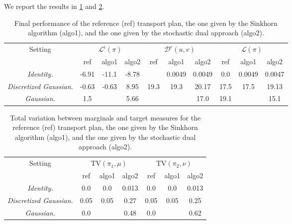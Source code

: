 \documentclass[a4paper,11pt]{article}
\newcommand{\1}{\mathbbm{1}}
\begin{document}
We report the results in \cref{tab:exp2} and \cref{tab:exp2_tv}.

\begin{table}[H]
    \centering
    \begin{tabular}{c|ccc|ccc|ccc}
        \toprule
        \multirow{2}{*}{Setting} & \multicolumn{3}{c}{$\mathcal{L}^{\epsilon}(\pi)$} & \multicolumn{3}{c}{$\mathcal{D}^{\epsilon}(u, v)$} & \multicolumn{3}{c}{$\mathcal{L}(\pi)$} \\
        \cmidrule(lr){2-4} \cmidrule(lr){5-7} \cmidrule(lr){8-10}
        & ref & algo1 & algo2 & ref & algo1 & algo2 & ref & algo1 & algo2 \\
        \midrule
        \emph{Identity.} & -6.91 & -11.1 & -8.78 & & 0.0049 & 0.0049 & 0.0 & 0.0049 & 0.0047 \\
        \emph{Discretized Gaussian.} & -0.63 & -0.63 & 8.95 & 19.3 & 19.3 & 20.17 & 17.5 & 17.5 & 19.13 \\
        \emph{Gaussian.} & 1.5 & & 5.66 & & & 17.0 & 19.1 & & 15.1 \\
        \bottomrule
    \end{tabular}
    \caption{Final performance of the reference (ref) transport plan, the one given by the Sinkhorn algorithm (algo1), and the one given by the stochastic dual approach (algo2).}
    \label{tab:exp2}
\end{table}

\begin{table}[H]
    \centering
    \begin{tabular}{c|ccc|ccc}
        \toprule
        \multirow{2}{*}{Setting} & \multicolumn{3}{c}{$\mathrm{TV}(\pi_1, \mu)$} & \multicolumn{3}{c}{$\mathrm{TV}(\pi_2, \nu)$} \\
        \cmidrule(lr){2-4} \cmidrule(lr){5-7}
        & ref & algo1 & algo2 & ref & algo1 & algo2 \\
        \midrule
        \emph{Identity.} & 0.0 & 0.0 & 0.013 & 0.0 & 0.0 & 0.013 \\
        \emph{Discretized Gaussian.} & 0.05 & 0.05 & 0.27 & 0.05 & 0.05 & 0.25 \\
        \emph{Gaussian.} & 0.0 & & 0.48 & 0.0 & & 0.62 \\
        \bottomrule
    \end{tabular}
    \caption{Total variation between marginals and target measures for the reference (ref) transport plan, the one given by the Sinkhorn algorithm (algo1), and the one given by the stochastic dual approach (algo2).}
    \label{tab:exp2_tv}
\end{table}
\end{document}

